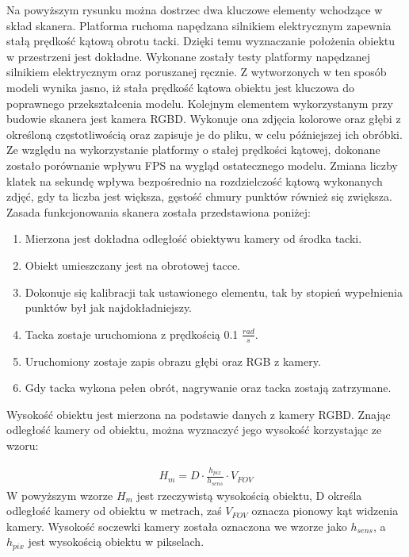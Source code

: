 Na powyższym rysunku można dostrzec dwa kluczowe elementy wchodzące w skład skanera. Platforma ruchoma napędzana silnikiem elektrycznym zapewnia stałą prędkość kątową obrotu tacki. Dzięki temu wyznaczanie położenia obiektu w przestrzeni jest dokładne. Wykonane zostały testy platformy napędzanej silnikiem elektrycznym oraz poruszanej ręcznie. Z wytworzonych w ten sposób modeli wynika jasno, iż stała prędkość kątowa obiektu jest kluczowa do poprawnego przekształcenia modelu. Kolejnym elementem wykorzystanym przy budowie skanera jest kamera RGBD. Wykonuje ona zdjęcia kolorowe oraz głębi z określoną częstotliwością oraz zapisuje je do pliku, w celu późniejszej ich obróbki. Ze względu na wykorzystanie platformy o stałej prędkości kątowej, dokonane zostało porównanie wpływu FPS na wygląd ostatecznego modelu. Zmiana liczby klatek na sekundę wpływa bezpośrednio na rozdzielczość kątową wykonanych zdjęć, gdy ta liczba jest większa, gęstość chmury punktów również się zwiększa.\\
\indent Zasada funkcjonowania skanera została przedstawiona poniżej:
\begin{enumerate}
    \item Mierzona jest dokładna odległość obiektywu kamery od środka tacki.
    \item Obiekt umieszczany jest na obrotowej tacce.
    \item Dokonuje się kalibracji tak ustawionego elementu, tak by stopień wypełnienia punktów był jak najdokładniejszy.
    \item Tacka zostaje uruchomiona z prędkością 0.1 $\frac{rad}{s}$.
    \item Uruchomiony zostaje zapis obrazu głębi oraz RGB z kamery.
    \item Gdy tacka wykona pełen obrót, nagrywanie oraz tacka zostają zatrzymane. 
\end{enumerate}

Wysokość obiektu jest mierzona na podstawie danych z kamery RGBD. Znając odległość kamery od obiektu, można wyznaczyć jego wysokość korzystając ze wzoru:

\begin{equation}
    \begin{aligned}
        H_{m}=D\cdot \frac{h_{pix}}{h_{sens}}\cdot V_{FOV}
    \end{aligned}
\label{equ:wysokoscRealPix}
\end{equation}
W powyższym wzorze $H_{m}$ jest rzeczywistą wysokością obiektu, D określa odległość kamery od obiektu w metrach, zaś $V_{FOV}$ oznacza pionowy kąt widzenia kamery. Wysokość soczewki kamery została oznaczona we wzorze jako $h_{sens}$, a $h_{pix}$ jest wysokością obiektu w pikselach. 


